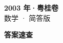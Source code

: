 \documentclass[zihao=-4, a4paper]{ctexart}
\begin{document}
\begin{center}
  {\Large\bfseries 2003 年·粤桂卷}\\[4pt]
  {\large 数学 · 简答版}
\end{center}
\medskip
{}

\clearpage
{}
\begin{center}{\Large\bfseries 答案速查}\end{center}
\medskip

\end{document}
